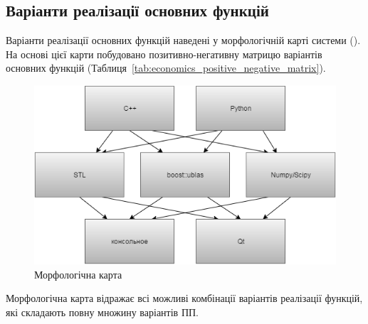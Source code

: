\subsection{Варіанти реалізації основних функцій}
Варіанти реалізації основних функцій наведені у морфологічній карті системи (). На основі цієї карти побудовано позитивно-негативну матрицю варіантів основних функцій (Таблиця~\ref{tab:economics_positive_negative_matrix}). 

\begin{figure}
	\centering
	\includegraphics[width=0.7\linewidth]{chapter_Economics/img/map}
	\caption{Морфологічна карта}
	\label{fig:economics_morph}
\end{figure}


Морфологічна карта відражає всі можливі комбінації варіантів реалізації функцій, які складають повну множину варіантів ПП.

